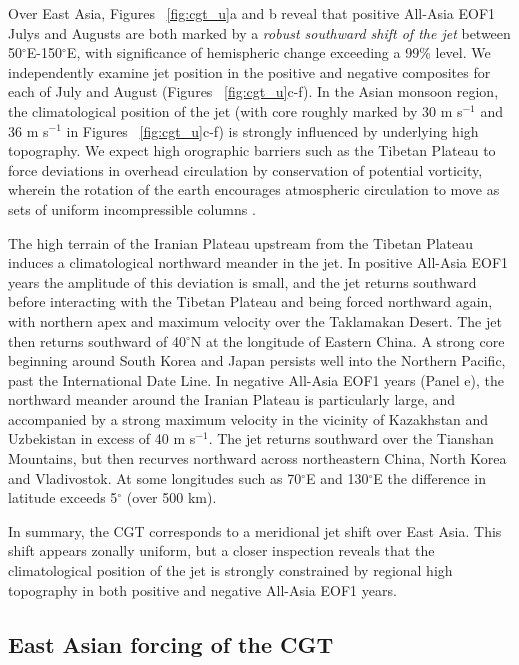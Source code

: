 	Over East Asia, Figures ~\ref{fig:cgt_u}a and b reveal that positive All-Asia EOF1 Julys and Augusts are both marked by a \textit{robust southward shift of the jet} between 50$^{\circ}$E-150$^{\circ}$E, with significance of hemispheric change exceeding a 99\% level. We independently examine jet position in the positive and negative composites for each of July and August (Figures  ~\ref{fig:cgt_u}c-f). In the Asian monsoon region, the climatological position of the jet (with core roughly marked by 30 m s$^{-1}$ and 36 m s$^{-1}$ in Figures ~\ref{fig:cgt_u}c-f) is strongly influenced by underlying high topography. We expect high orographic barriers such as the Tibetan Plateau to force deviations in overhead circulation by conservation of potential vorticity, wherein the rotation of the earth encourages atmospheric circulation to move as sets of uniform incompressible columns \citep{Holton2004a}.
	
	The high terrain of the Iranian Plateau upstream from the Tibetan Plateau induces a climatological northward meander in the jet. In positive All-Asia EOF1 years the amplitude of this deviation is small, and the jet returns southward before interacting with the Tibetan Plateau and being forced northward again, with northern apex and maximum velocity over the Taklamakan Desert. The jet then returns southward of 40$^{\circ}$N at the longitude of Eastern China. A strong core beginning around South Korea and Japan persists well into the Northern Pacific, past the International Date Line. In negative All-Asia EOF1 years (Panel e), the northward meander around the Iranian Plateau is particularly large, and accompanied by a strong maximum velocity in the vicinity of Kazakhstan and Uzbekistan in excess of 40 m s$^{-1}$. The jet returns southward over the Tianshan Mountains, but then recurves northward across northeastern China, North Korea and Vladivostok. At some longitudes such as 70$^{\circ}$E and 130$^{\circ}$E the difference in latitude exceeds 5$^{\circ}$ (over 500 km).
	
	In summary, the CGT corresponds to a meridional jet shift over East Asia. This shift appears zonally uniform, but a closer inspection reveals that the climatological position of the jet is strongly constrained by regional high topography in both positive and negative All-Asia EOF1 years.
	
\subsection{East Asian forcing of the CGT}

